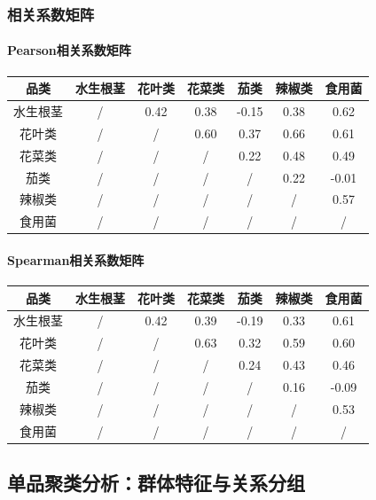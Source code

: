 \documentclass{cumcmthesis}
\begin{document}
\subsubsection{相关系数矩阵} 
\paragraph{Pearson相关系数矩阵}
\begin{table}[H]
\centering
\begin{tabular}{c c c c c c c}
\toprule
品类 & 水生根茎 & 花叶类 & 花菜类 & 茄类 & 辣椒类 & 食用菌 \\
\midrule
水生根茎 & / & 0.42 & 0.38 & -0.15 & 0.38 & 0.62 \\
花叶类 & / & / & 0.60 & 0.37 & 0.66 & 0.61 \\
花菜类 & / & / & / & 0.22 & 0.48 & 0.49 \\
茄类 & / & / & / & / & 0.22 & -0.01 \\
辣椒类 & / & / & / & / & / & 0.57 \\
食用菌 & / & / & / & / & / & / \\
\bottomrule
\end{tabular}
\end{table}

\paragraph{Spearman相关系数矩阵}
\begin{table}[H]
\centering
\begin{tabular}{c c c c c c c}
\toprule
品类 & 水生根茎 & 花叶类 & 花菜类 & 茄类 & 辣椒类 & 食用菌 \\
\midrule
水生根茎 & / & 0.42 & 0.39 & -0.19 & 0.33 & 0.61 \\
花叶类 & / & / & 0.63 & 0.32 & 0.59 & 0.60 \\
花菜类 & / & / & / & 0.24 & 0.43 & 0.46 \\
茄类 & / & / & / & / & 0.16 & -0.09 \\
辣椒类 & / & / & / & / & / & 0.53 \\
食用菌 & / & / & / & / & / & / \\
\bottomrule
\end{tabular}
\end{table}


\subsection{单品聚类分析：群体特征与关系分组}
\end{document}
